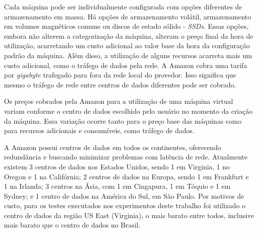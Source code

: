 
Cada máquina pode ser individualmente configurada com opções diferentes de armazenamento
em massa. Há opções de armazenamento volátil, armazenamento em volumes magnéticos
comuns ou discos de estado sólido - \emph{SSDs}. Essas opções, embora não alterem
a categorização da máquina, alteram o preço final da hora de utilização, acarretando
um custo adicional ao valor base da hora da configuração padrão da máquina. Além
disso, a utilização de alguns recursos acarreta mais um custo adicional, como o
tráfego de dados pela rede. A Amazon cobra uma tarifa por \emph{gigabyte} trafegado
para fora da rede local do provedor. Isso significa que mesmo o tráfego de rede 
entre centros de dados diferentes pode ser cobrado.

Os preços cobrados pela Amazon para a utilização de uma máquina virtual variam 
conforme o centro de dados escolhido pelo usuário no momento da criação da máquina.
Essa variação ocorre tanto para o preço base das máquinas como para recursos adicionais
e consumíveis, como tráfego de dados.

A Amazon possui centros de dados em todos os continentes, oferecendo redundância
e buscando minimizar problemas com latência de rede. Atualmente existem 3 centros de
dados nos Estados Unidos, sendo 1 em Virginia, 1 no Oregon e 1 na Califórnia; 2 
centros de dados na Europa, sendo 1 em Frankfurt e 1 na Irlanda; 3 centros na Ásia,
com 1 em Cingapura, 1 em Tóquio e 1 em Sydney; e 1 centro de dados na América do
Sul, em São Paulo. Por motivos de custo, para os testes executados nos experimentos 
deste trabalho foi utilizado o centro de dados da região US East (Virginia), o
mais barato entre todos, inclusive mais barato que o centro de dados no Brasil.   

